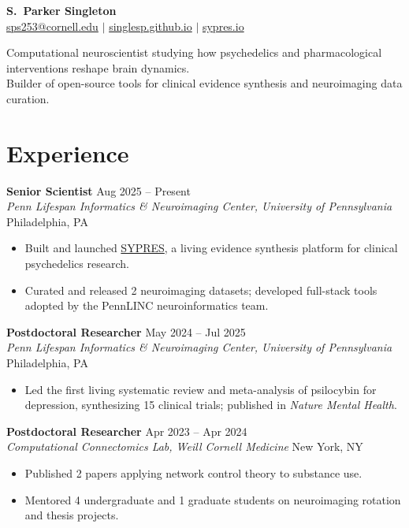 \documentclass[10pt, letterpaper]{article}
\newcommand{\roleentry}[4]{%
  \textbf{#1} \hfill \textcolor{light}{\small #2} \\[-0.15em]
  {\small\textit{#3} \hfill #4}
  \vspace{0.1em}
}
\begin{document}
\begin{center}
  {\LARGE\bfseries\color{accent} S.\ Parker Singleton}\\[0.15em]
  {\small
    \href{mailto:sps253@cornell.edu}{sps253@cornell.edu}
    \enspace$\vert$\enspace
    \href{https://singlesp.github.io}{singlesp.github.io}
    \enspace$\vert$\enspace
    \href{https://sypres.io}{sypres.io}
  }
\end{center}

\vspace{0.1em}
\begin{center}
  {\small Computational neuroscientist studying how psychedelics and pharmacological interventions reshape brain dynamics. \\
  Builder of open-source tools for clinical evidence synthesis and neuroimaging data curation.}
\end{center}

\section{Experience}

\roleentry{Senior Scientist}{Aug 2025 -- Present}
  {Penn Lifespan Informatics \& Neuroimaging Center, University of Pennsylvania}{Philadelphia, PA}
\begin{itemize}
  \item Built and launched \href{https://sypres.io}{SYPRES}, a living evidence synthesis platform for clinical psychedelics research.
  \item Curated and released 2 neuroimaging datasets; developed full-stack tools adopted by the PennLINC neuroinformatics team.
\end{itemize}
\vspace{0.1em}

\roleentry{Postdoctoral Researcher}{May 2024 -- Jul 2025}
  {Penn Lifespan Informatics \& Neuroimaging Center, University of Pennsylvania}{Philadelphia, PA}
\begin{itemize}
  \item Led the first living systematic review and meta-analysis of psilocybin for depression, synthesizing 15 clinical trials; published in \textit{Nature Mental Health}.
\end{itemize}
\vspace{0.1em}

\roleentry{Postdoctoral Researcher}{Apr 2023 -- Apr 2024}
  {Computational Connectomics Lab, Weill Cornell Medicine}{New York, NY}
\begin{itemize}
  \item Published 2 papers applying network control theory to substance use.
  \item Mentored 4 undergraduate and 1 graduate students on neuroimaging rotation and thesis projects.
\end{itemize}
\vspace{0.1em}
\end{document}
